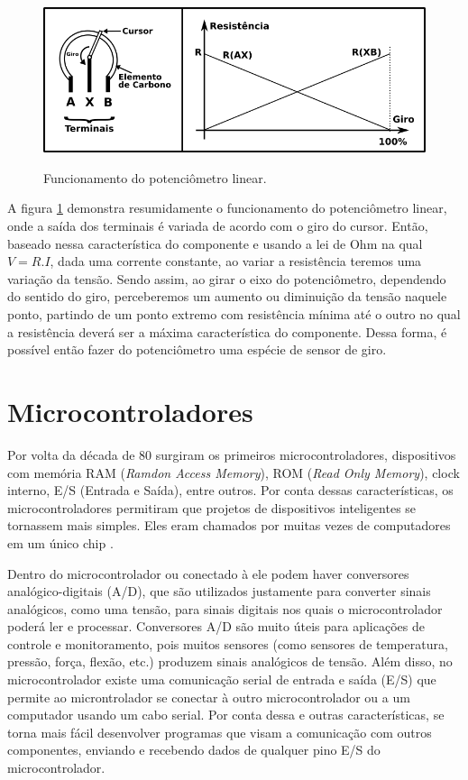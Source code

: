 \documentclass[
	12pt,				%
	openright,			%
	oneside,			%
	a4paper,			%
	english,			%
	brazil				%
	]{abntex2}
\begin{document}
		\begin{figure}[h!]
			\centering
  		\caption{Funcionamento do potenciômetro linear.}
  		\includegraphics[width=12cm]{./figures/potentiometer1.png}
  		\label{Fig:potentiometer1}
		\end{figure}

		A figura \ref{Fig:potentiometer1} demonstra resumidamente o funcionamento do potenciômetro linear, onde a saída dos terminais é variada de acordo com o giro do cursor. Então, baseado nessa característica do componente e usando a lei de Ohm na qual $V = R.I$, dada uma corrente constante, ao variar a resistência teremos uma variação da tensão. Sendo assim, ao girar o eixo do potenciômetro, dependendo do sentido do giro, perceberemos um aumento ou diminuição da tensão naquele ponto, partindo de um ponto extremo com resistência mínima até o outro no qual a resistência deverá ser a máxima característica do componente. Dessa forma, é possível então fazer do potenciômetro uma espécie de sensor de giro.


		\section{Microcontroladores}

		Por volta da década de 80 surgiram os primeiros microcontroladores, dispositivos com memória RAM (\textit{Ramdon Access Memory}), ROM (\textit{Read Only Memory}), clock interno, E/S (Entrada e Saída), entre outros. Por conta dessas características, os microcontroladores permitiram que projetos de dispositivos inteligentes se tornassem mais simples. Eles eram chamados por muitas vezes de computadores em um único chip \cite{pereiramicrocontroladores}. 

		Dentro do microcontrolador ou conectado à ele podem haver conversores analógico-digitais (A/D), que são utilizados justamente para converter sinais analógicos, como uma tensão, para sinais digitais nos quais o microcontrolador poderá ler e processar. Conversores A/D são muito úteis para aplicações de controle e monitoramento, pois muitos sensores (como sensores de temperatura, pressão, força, flexão, etc.) produzem sinais analógicos de tensão. Além disso, no microcontrolador existe uma comunicação serial de entrada e saída (E/S) que permite ao microntrolador se conectar à outro microcontrolador ou a um computador usando um cabo serial. Por conta dessa e outras características, se torna mais fácil desenvolver programas que visam a comunicação com outros componentes, enviando e recebendo dados de qualquer pino E/S do microcontrolador. \cite{ibrahim2011advanced}
\end{document}
